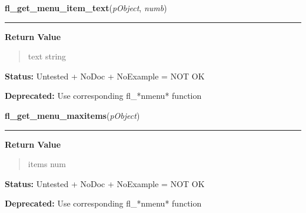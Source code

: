     \label{xformslib:deprecated:fl_get_menu_item_text}

    \vspace{0.5ex}

\hspace{.8\funcindent}\begin{boxedminipage}{\funcwidth}

    \raggedright \textbf{fl\_get\_menu\_item\_text}(\textit{pObject}, \textit{numb})

    \vspace{-1.5ex}

    \rule{\textwidth}{0.5\fboxrule}
\setlength{\parskip}{2ex}
\setlength{\parskip}{1ex}
      \textbf{Return Value}
    \vspace{-1ex}

      \begin{quote}
      text string

      \end{quote}

\textbf{Status:} Untested + NoDoc + NoExample = NOT OK



\textbf{Deprecated:} Use corresponding fl\_*nmenu* function



    \end{boxedminipage}

    \label{xformslib:deprecated:fl_get_menu_maxitems}

    \vspace{0.5ex}

\hspace{.8\funcindent}\begin{boxedminipage}{\funcwidth}

    \raggedright \textbf{fl\_get\_menu\_maxitems}(\textit{pObject})

    \vspace{-1.5ex}

    \rule{\textwidth}{0.5\fboxrule}
\setlength{\parskip}{2ex}
\setlength{\parskip}{1ex}
      \textbf{Return Value}
    \vspace{-1ex}

      \begin{quote}
      items num

      \end{quote}

\textbf{Status:} Untested + NoDoc + NoExample = NOT OK



\textbf{Deprecated:} Use corresponding fl\_*nmenu* function



    \end{boxedminipage}


